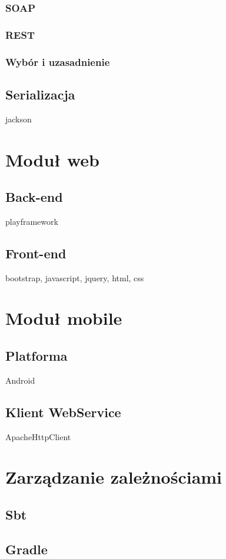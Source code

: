 \documentclass[11pt]{aghdpl}
\begin{document}
\subsubsection{SOAP}
\subsubsection{REST}
\subsubsection{Wybór i uzasadnienie}
\subsection{Serializacja}
jackson
\section{Moduł web}
\subsection{Back-end}
playframework
\subsection{Front-end}
bootstrap, javascript, jquery, html, css
\section{Moduł mobile}
\subsection{Platforma}
Android
\subsection{Klient WebService}
ApacheHttpClient
\section{Zarządzanie zależnościami}
\subsection{Sbt}
\subsection{Gradle}

\end{document}
